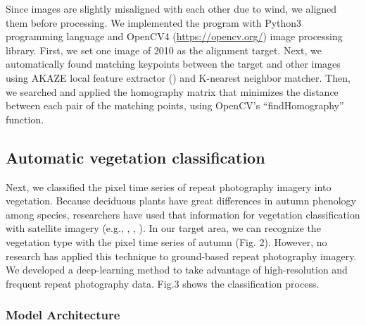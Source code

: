 \documentclass{article}
\begin{document}
Since images are slightly misaligned with each other due to wind, we
aligned them before processing. We implemented the program with Python3
programming language and OpenCV4 (\url{https://opencv.org/}) image
processing library. First, we set one image of 2010 as the alignment
target. Next, we automatically found matching keypoints between the
target and other images using AKAZE local feature extractor
(\cite{Alcantarilla2013AKAZE}) and K-nearest neighbor matcher. Then, we
searched and applied the homography matrix that minimizes the distance
between each pair of the matching points, using OpenCV's
``findHomography'' function.

\hypertarget{automatic-vegetation-classification}{%
\subsection{Automatic vegetation
classification}\label{automatic-vegetation-classification}}

Next, we classified the pixel time series of repeat photography imagery
into vegetation. Because deciduous plants have great differences in
autumn phenology among species, researchers have used that information
for vegetation classification with satellite imagery (e.g.,
\cite{Tigges2013RemSenEnv}, \cite{Son2013RemSen}, \cite{Heupel2018PFG}).
In our target area, we can recognize the vegetation type with the pixel
time series of autumn (Fig. 2). However, no research has applied this
technique to ground-based repeat photography imagery. We developed a
deep-learning method to take advantage of high-resolution and frequent
repeat photography data. Fig.3 shows the classification process.

\hypertarget{model-architecture}{%
\subsubsection{Model Architecture}\label{model-architecture}}
\end{document}
